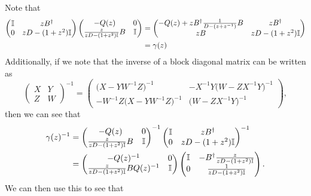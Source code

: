 \documentclass[../thesis-main/thesis-main]{subfiles}
\begin{document}
Note that 
\begin{align}
  \begin{pmatrix} \mathbb{I} & zB^\dag\\
    0 & z D - (1+ z^2) \mathbb{I} \end{pmatrix}
    \begin{pmatrix} - Q(z) & 0\\
      \frac{z}{zD - (1+ z^2)\mathbb{I}}B & \mathbb{I}\end{pmatrix} 
      &= \begin{pmatrix} -Q(z) + z B^\dag \frac{1}{D - (z + z^{-1})} B & z B^\dag\\
        zB & zD - (1+z^2)\mathbb{I}\end{pmatrix} \\
        &= \gamma(z)
\end{align}
Additionally, if we note that the inverse of a block diagonal matrix can be written as
\begin{equation}
  \begin{pmatrix} X & Y \\
  Z & W\end{pmatrix}^{-1} = \begin{pmatrix} \big(X - Y W^{-1} Z\big)^{-1} & - X^{-1} Y \big(W - Z X^{-1} Y\big)^{-1}\\
    - W^{-1} Z \big(X - Y W^{-1} Z\big)^{-1} & \big(W - Z X^{-1} Y\big)^{-1}\end{pmatrix},
\end{equation}
then we can see that
\begin{align}\gamma(z)^{-1} &= \begin{pmatrix} - Q(z) & 0\\
      \frac{z}{zD - (1+ z^2)\mathbb{I}}B & \mathbb{I}\end{pmatrix}^{-1} \begin{pmatrix} \mathbb{I} & zB^\dag\\
    0 & z D - (1+ z^2) \mathbb{I} \end{pmatrix}^{-1}\\
    &= \begin{pmatrix}
      - Q(z)^{-1} & 0\\
      \frac{z}{z D - (1+z^2)\mathbb{I}} B Q(z)^{-1} & \mathbb{I}
    \end{pmatrix}
    \begin{pmatrix}
      \mathbb{I} & - B^{\dag} \frac{z}{zD - (1+z^2)\mathbb{I}}\\
      0 & \frac{1}{zD - (1+z^2)\mathbb{I}}
    \end{pmatrix}.
\end{align}
We can then use this to see that
\end{document}
